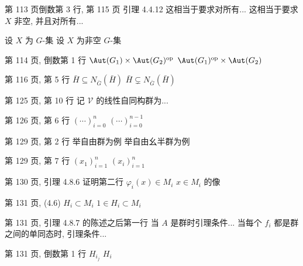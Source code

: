 \documentclass{AJerrata}
\begin{document}
\begin{Errata}
        \item[第 113 页倒数第 3 行, 第 115 页 引理 4.4.12]
        \Orig 这相当于要求对所有...
        \newline
        \Corr 这相当于要求 $X$ 非空, 并且对所有...
        
        \Orig 设 $X$ 为 $G$-集
        \Corr 设 $X$ 为非空 $G$-集
        
        \item[第 114 页, 倒数第 1 行]
        \Orig $\Aut(G_1) \times \Aut(G_2)^{\mathrm{op}}$
        \Corr $\Aut(G_1)^{\mathrm{op}} \times \Aut(G_2)$
        
        \item[第 116 页, 第 5 行]
        \Orig $\bar{H} \subseteq N_{\bar{G}}(\bar{H})$
        \Corr $\bar{H} \subsetneq N_{\bar{G}}(\bar{H})$

		\item[第 125 页, 第 10 行]
		\Corr 记 $\mathcal{V}$ 的线性自同构群为...

		\item[第 126 页, 第 6 行]
		\Orig $\left( \cdots \right)_{i=0}^n$
		\Corr $\left( \cdots \right)_{i=0}^{n-1}$
		
		\item[第 129 页, 第 2 行]
		\Orig 举自由群为例
		\Corr 举自由幺半群为例
		
		\item[第 129 页, 第 7 行]
		\Orig $(x_1)_{i=1}^n$
		\Corr $(x_i)_{i=1}^n$
		
		\item[第 130 页, 引理 4.8.6 证明第二行]
		\Orig $\varphi_i(x) \in M_i$
		\Corr $x \in M_i$ 的像
		
		\item[第 131 页, (4.6)]
		\Orig $H_i \subset M_i$
		\Corr $1 \in H_i \subset M_i$
		
		\item[第 131 页, 引理 4.8.7 的陈述之后第一行]
		\Orig 当 $A$ 是群时引理条件...
		\Corr 当每个 $f_i$ 都是群之间的单同态时, 引理条件...
		
		\item[第 131 页, 倒数第 1 行]
		\Orig $H_{i_j}$
		\Corr $H_i$
		

\end{Errata}
\end{document}
